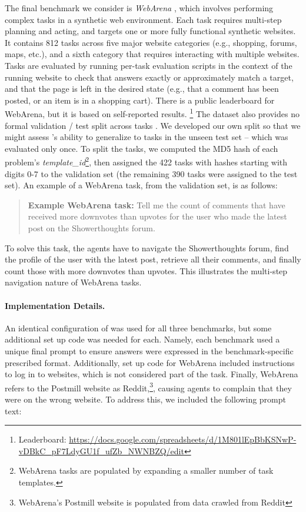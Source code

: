 The final benchmark we consider is \emph{WebArena} \cite{zhou2024webarenarealisticwebenvironment}, which involves performing complex tasks in a synthetic web environment. Each task requires multi-step planning and acting, and targets one or more fully functional synthetic websites. It contains 812 tasks across five major website categories (e.g., shopping, forums, maps, etc.), and a sixth category that requires interacting with multiple websites.
Tasks are evaluated by running per-task evaluation scripts in the context of the running website to check that answers exactly or approximately match a target, and that the page is left in the desired state (e.g., that a comment has been posted, or an item is in a shopping cart). There is a public leaderboard for WebArena, but it is based on self-reported results.
\footnote{Leaderboard: \url{https://docs.google.com/spreadsheets/d/1M801lEpBbKSNwP-vDBkC_pF7LdyGU1f_ufZb_NWNBZQ/edit}}
The dataset also provides no formal validation / test split across tasks \cite{kapoor2024aiagentsmatter}. We developed our own split so that we might assess \team{}'s ability to generalize to tasks in the unseen test set --  which was evaluated only once. To split the tasks, we computed the MD5 hash of each problem's \emph{template\_id}\footnote{WebArena tasks are populated by expanding a smaller number of task templates.}, then assigned the 422 tasks with hashes starting with digits 0-7 to the validation set (the remaining 390 tasks were assigned to the test set). An example of a WebArena task, from the validation set, is as follows:

\begin{quote}
\textbf{Example WebArena task:} Tell me the count of comments that have received more downvotes than upvotes for the user who made the latest post on the Showerthoughts forum.
\end{quote}
To solve this task, the agents have to navigate the Showerthoughts forum, find the profile of the user with the latest post, retrieve all their comments, and finally count those with more downvotes than upvotes. This illustrates the multi-step navigation nature of WebArena tasks. 



\paragraph{Implementation Details.} 
An identical configuration of \team was used for all three benchmarks, but some additional set up code was needed for each. Namely, each benchmark used a unique final prompt to ensure answers were expressed in the benchmark-specific prescribed format. Additionally, set up code for WebArena included instructions to log in to websites, which is not considered part of the task. Finally, WebArena refers to the Postmill website as Reddit,\footnote{WebArena's Postmill website is populated from data crawled from Reddit}, causing agents to complain that they were on the wrong website. To address this, we included the following prompt text:

